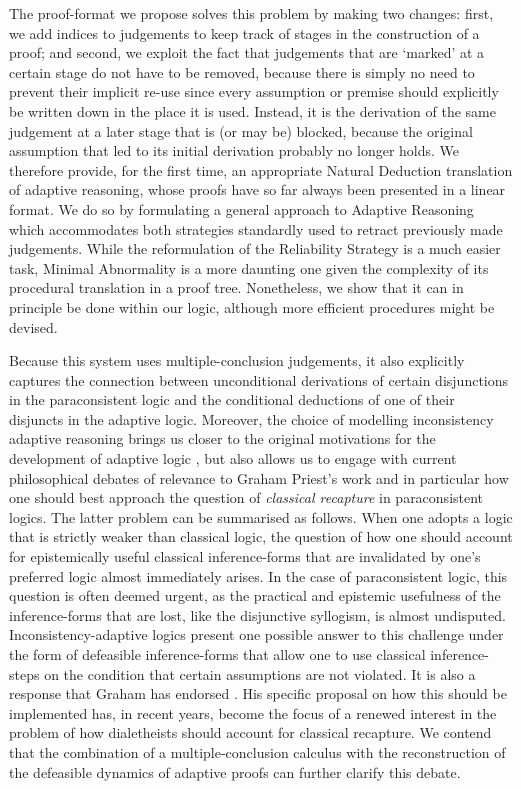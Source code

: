 \documentclass[]{article}
\begin{document}
The proof-format we propose solves this problem by making two changes: first, we add indices to judgements to keep track of stages in the construction of a proof; and second, we exploit the fact that judgements that are `marked' at a certain stage do not have to be removed, because there is simply no need to prevent their implicit re-use since every assumption or premise should explicitly be written down in the place it is used. Instead, it is the derivation of the same judgement at a later stage that is (or may be) blocked, because the original assumption that led to its initial derivation probably no longer holds. We therefore provide, for the first time, an appropriate Natural Deduction translation of adaptive reasoning, whose proofs have so far always been presented in a linear format. We do so by formulating a general approach to Adaptive Reasoning which accommodates both strategies standardly used to retract previously made judgements. While the reformulation of the Reliability Strategy is a much easier task, Minimal Abnormality is a more daunting one given the complexity of its procedural translation in a proof tree. Nonetheless, we show that it can in principle be done within our logic, although more efficient procedures might be devised.

Because this system uses multiple-conclusion judgements, it also explicitly captures the connection between unconditional derivations of certain disjunctions in the paraconsistent logic and the conditional deductions of one of their disjuncts in the adaptive logic. Moreover, the choice of modelling inconsistency adaptive reasoning brings us closer to the original motivations for the development of adaptive logic \cite{Batens:ParaconsistentLogicEssaysOnTheInconsistent:1989}, but also allows us to engage with current philosophical debates of relevance to Graham Priest's work and in particular how one should best approach the question of \textit{classical recapture} in paraconsistent logics. The latter problem can be summarised as follows. When one adopts a logic that is strictly weaker than classical logic, the question of how one should account for epistemically useful classical inference-forms that are invalidated by one's preferred logic almost immediately arises. In the case of paraconsistent logic, this question is often deemed urgent, as the practical and epistemic usefulness of the inference-forms that are lost, like the disjunctive syllogism, is almost undisputed. Inconsistency-adaptive logics present one possible answer to this challenge under the form of defeasible inference-forms that allow one to use classical inference-steps on the condition that certain assumptions are not violated. It is also a response that Graham has endorsed \cite{GP:LPm} \cite[Ch.\ 16]{Priest:InContradiction:2006}. His specific proposal on how this should be implemented has, in recent years, become the focus of a renewed interest in the problem of how dialetheists should account for classical recapture. We contend that the combination of a multiple-conclusion calculus with the reconstruction of the defeasible dynamics of adaptive proofs can further clarify this debate.
\end{document}
